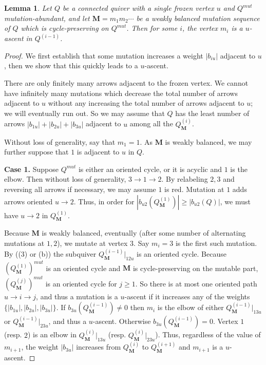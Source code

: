\documentclass[12pt]{amsart}
\newtheorem{lem}[thm]{Lemma}
\theoremstyle{definition}
\theoremstyle{remark}
\numberwithin{equation}{section}
\begin{document}
\begin{lem} 
\label{lem:weakly balanced grows}
Let $Q$ be a connected quiver with a single frozen vertex $u$ and $Q^{mut}$ mutation-abundant, and let $\mathbf M = m_1 m_2 \cdots$ be a weakly balanced mutation sequence of $Q$ which is cycle-preserving on $Q^{mut}$. 
Then for some $i$, the vertex $m_i$ is a $u$-ascent in $Q^{(i-1)}$. 
\end{lem}

\begin{proof} 
We first establish that some mutation increases a weight $|b_{iu}|$ adjacent to $u$, then we show that this quickly leads to a $u$-ascent.

There are only finitely many arrows adjacent to the frozen vertex. 
We cannot have infinitely many mutations which decrease the total number of arrows adjacent to $u$ without any increasing the total number of arrows adjacent to $u$; we will eventually run out. 
So we may assume that $Q$ has the least number of arrows $|b_{1u}| + |b_{2u}| + |b_{3u}|$ adjacent to $u$ among all the $Q^{(i)}_{\mathbf M}$. %

Without loss of generality, say that $m_1=1$. 
As $\mathbf M$ is weakly balanced, we may further suppose that $1$ is adjacent to $u$ in $Q$. \medskip

\textbf{Case 1.} Suppose $Q^{mut}$ is either an oriented cycle, or it is acyclic and $1$ is the elbow. 
Then without loss of generality, $3 \rightarrow 1 \rightarrow 2$.
By relabeling $2,3$ and reversing all arrows if necessary, we may assume $1$ is red.
Mutation at $1$ adds arrows oriented $u \rightarrow 2$.
Thus, in order for $|b_{u2}(Q^{(1)}_{\mathbf M})| \geq |b_{u2}(Q)|$, we must have $u \rightarrow 2$ in $Q^{(1)}_{\mathbf M}$. %

Because $\mathbf M$ is weakly balanced, eventually (after some number of alternating mutations at $1,2$), we mutate at vertex $3$. Say $m_i = 3$ is the first such mutation. 
By  ((3) or (b)) the subquiver $Q^{(i-1)}_{\mathbf M}|_{12u}$ is an oriented cycle.
Because $(Q^{(1)}_{\mathbf M})^{mut}$ is an oriented cycle and $\mathbf M$ is cycle-preserving on the mutable part, $(Q^{(j)}_{\mathbf M})^{mut}$ is an oriented cycle for $j \geq 1$. So there is at most one oriented path $u \rightarrow i \rightarrow j$, and thus a mutation is a $u$-ascent if it increases any of the weights $\{|b_{1u}|, |b_{2u}|, |b_{3u}|\}$.
If $b_{3u}(Q^{(i-1)}_{\mathbf M}) \neq 0$ then $m_i$ is the elbow of either $Q^{(i-1)}_{\mathbf M}|_{13u}$ or $Q^{(i-1)}_{\mathbf M}|_{23u}$, and thus a $u$-ascent. 
Otherwise $b_{3u}(Q^{(i-1)}_{\mathbf M})=0$. 
Vertex $1$ (resp. $2$) is an elbow in $Q^{(i)}_{\mathbf{M}}|_{13u}$ (resp. $Q^{(i)}_{\mathbf{M}}|_{23u}$). 
Thus, regardless of the value of $m_{i+1}$, the weight $|b_{3u}|$ increases from $Q^{(i)}_{\mathbf M}$ to $Q^{(i+1)}_{\mathbf M}$ and $m_{i+1}$ is a $u$-ascent. \medskip


\end{proof}
\end{document}
